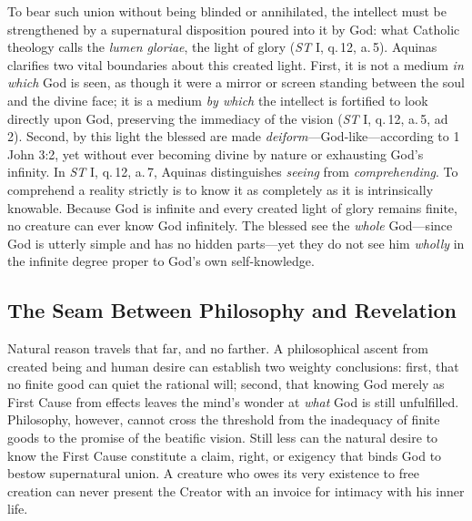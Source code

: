To bear such union without being blinded or annihilated, the intellect must be strengthened by a supernatural disposition poured into it by God: what Catholic theology calls the \emph{lumen gloriae}, the light of glory (\emph{ST} I, q.\,12, a.\,5). Aquinas clarifies two vital boundaries about this created light. First, it is not a medium \emph{in which} God is seen, as though it were a mirror or screen standing between the soul and the divine face; it is a medium \emph{by which} the intellect is fortified to look directly upon God, preserving the immediacy of the vision (\emph{ST} I, q.\,12, a.\,5, ad 2). Second, by this light the blessed are made \emph{deiform}---God-like---according to 1 John 3:2, yet without ever becoming divine by nature or exhausting God's infinity. In \emph{ST} I, q.\,12, a.\,7, Aquinas distinguishes \emph{seeing} from \emph{comprehending}. To comprehend a reality strictly is to know it as completely as it is intrinsically knowable. Because God is infinite and every created light of glory remains finite, no creature can ever know God infinitely. The blessed see the \emph{whole} God---since God is utterly simple and has no hidden parts---yet they do not see him \emph{wholly} in the infinite degree proper to God's own self-knowledge.

\subsection*{The Seam Between Philosophy and Revelation}

Natural reason travels that far, and no farther. A philosophical ascent from created being and human desire can establish two weighty conclusions: first, that no finite good can quiet the rational will; second, that knowing God merely as First Cause from effects leaves the mind's wonder at \emph{what} God is still unfulfilled. Philosophy, however, cannot cross the threshold from the inadequacy of finite goods to the promise of the beatific vision. Still less can the natural desire to know the First Cause constitute a claim, right, or exigency that binds God to bestow supernatural union. A creature who owes its very existence to free creation can never present the Creator with an invoice for intimacy with his inner life.

